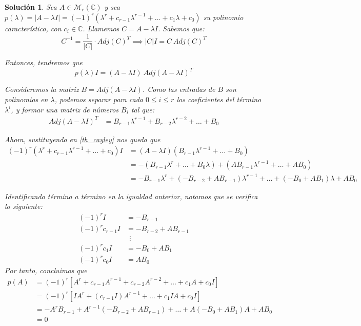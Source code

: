 \documentclass[11pt, a4paper]{article}
\newif\IfInSansMode
\numberwithin{equation}{section}
\theoremstyle{theorem-style}
\theoremstyle{definition-style}
\theoremstyle{remark-style}
\newtheorem*{sol}{Solución}
\theoremstyle{example-style}
\begin{document}
    \begin{sol}
        Sea $A \in \mathcal M_{r}(\mathbb C)$ y sea $p(\lambda) = |A - \lambda I| = (-1)^r(\lambda^r + c_{r-1}\lambda^{r-1} + \hdots + c_1\lambda + c_0)$ su polinomio característico, con $c_i \in \mathbb{C}$. Llamemos $C = A - \lambda I$. Sabemos que: $$C^{-1} = \frac{1}{|C|} \cdot Adj(C)^T \implies |C|I = C \ Adj(C)^T$$

        Entonces, tendremos que 
        \begin{equation} \label {th_cayley}
            p(\lambda)I = (A - \lambda I) \ Adj(A-\lambda I)^T
        \end{equation} 

        Consideremos la matriz $B = Adj(A - \lambda I)$. Como las entradas de $B$ son polinomios en $\lambda$, podemos separar para cada $0 \le i \le r$ los coeficientes del término $\lambda^i$, y formar una matriz de números $B_i$ tal que:
        \begin{align*}
            Adj(A - \lambda I)^T &= B_{r-1}\lambda^{r-1} + B_{r-2}\lambda^{r-2} + \hdots + B_0
        \end{align*}

        Ahora, sustituyendo en \eqref{th_cayley} nos queda que
        \begin{align*}
            (-1)^r(\lambda^r + c_{r-1}\lambda^{r-1} + \hdots + c_0)I &= (A -\lambda I)(B_{r-1}\lambda^{r-1} + \hdots + B_0) \\
                                                                     &= -(B_{r-1}\lambda^r + \hdots + B_0\lambda) + (AB_{r-1}\lambda^{r-1}+\hdots + AB_0) \\
                                                                     &= -B_{r-1}\lambda^r + (-B_{r-2}+AB_{r-1})\lambda^{r-1} + \hdots + (-B_0 + AB_1)\lambda + AB_0
        \end{align*}

        Identificando término a término en la igualdad anterior, notamos que se verifica lo siguiente:
        \begin{align*}
            \label{}
            (-1)^rI &= -B_{r-1} \\
            (-1)^rc_{r-1}I &= -B_{r-2}+AB_{r-1} \\
                           &\ \ \vdots \\
            (-1)^rc_1I &= -B_0 + AB_1 \\
            (-1)^rc_0I &= AB_0
        \end{align*}
        Por tanto, concluimos que
        \begin{align*}
            \label{}
            p(A) &= (-1)^r \left[ A^r + c_{r-1}A^{r-1} + c_{r-2}A^{r-2} + \hdots + c_1A + c_0I \right] \\
                 &= (-1)^r \left[ IA^r + (c_{r-1}I)A^{r-1} + \hdots + c_1IA + c_0I \right] \\
                 &= -A^{r}B_{r-1}+A^{r-1}(-B_{r-2}+AB_{r-1}) + \hdots + A(-B_0 + AB_1)A + AB_0 \\ 
                 &= 0
        \end{align*}
    \end{sol}
\end{document}
